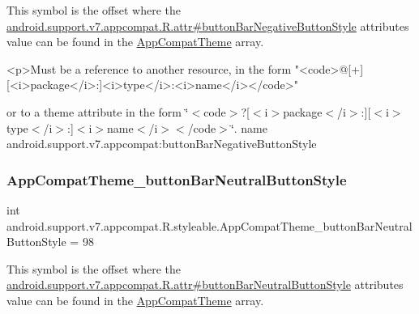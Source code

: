 This symbol is the offset where the \hyperlink{classandroid_1_1support_1_1v7_1_1appcompat_1_1R_1_1attr_aa0cf6c74c730bec0f705aa4117be0519}{android.\+support.\+v7.\+appcompat.\+R.\+attr\#button\+Bar\+Negative\+Button\+Style} attribute\textquotesingle{}s value can be found in the \hyperlink{classandroid_1_1support_1_1v7_1_1appcompat_1_1R_1_1styleable_a5c42f89e8a410c323be34208d75c430b}{App\+Compat\+Theme} array.

\begin{DoxyVerb}      <p>Must be a reference to another resource, in the form "<code>@[+][<i>package</i>:]<i>type</i>:<i>name</i></code>"
\end{DoxyVerb}
 or to a theme attribute in the form \char`\"{}$<$code$>$?\mbox{[}$<$i$>$package$<$/i$>$\+:\mbox{]}\mbox{[}$<$i$>$type$<$/i$>$\+:\mbox{]}$<$i$>$name$<$/i$>$$<$/code$>$\char`\"{}.  name android.\+support.\+v7.\+appcompat\+:button\+Bar\+Negative\+Button\+Style \mbox{\label{classandroid_1_1support_1_1v7_1_1appcompat_1_1R_1_1styleable_aec02227eb23e237d76e41c93095e1acc}} 
\subsubsection{\texorpdfstring{App\+Compat\+Theme\+\_\+button\+Bar\+Neutral\+Button\+Style}{AppCompatTheme\_buttonBarNeutralButtonStyle}}
{\footnotesize\ttfamily int android.\+support.\+v7.\+appcompat.\+R.\+styleable.\+App\+Compat\+Theme\+\_\+button\+Bar\+Neutral\+Button\+Style = 98\hspace{0.3cm}{\ttfamily [static]}}

This symbol is the offset where the \hyperlink{classandroid_1_1support_1_1v7_1_1appcompat_1_1R_1_1attr_abd23fc1a59a95a9af1c5648bc93cb339}{android.\+support.\+v7.\+appcompat.\+R.\+attr\#button\+Bar\+Neutral\+Button\+Style} attribute\textquotesingle{}s value can be found in the \hyperlink{classandroid_1_1support_1_1v7_1_1appcompat_1_1R_1_1styleable_a5c42f89e8a410c323be34208d75c430b}{App\+Compat\+Theme} array.

